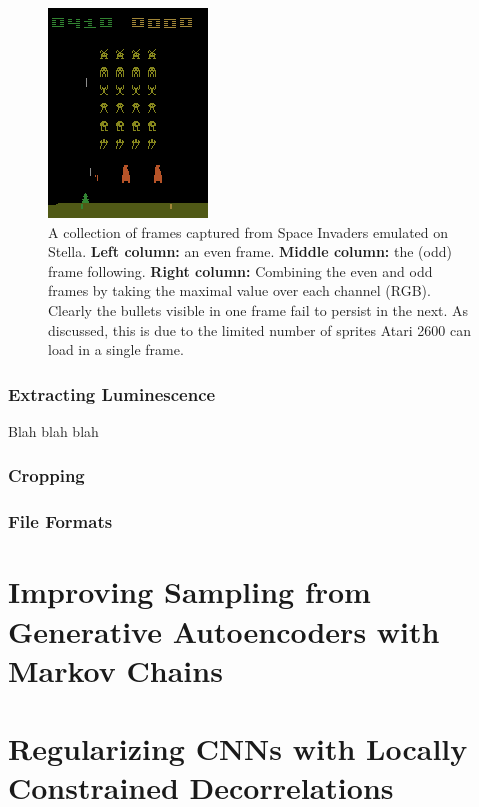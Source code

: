 \begin{figure}
\begin{multicols}{3}
    \includegraphics[scale=0.8]{figures/related_work/space_invaders_1044_rgb_maximum_of_even_odd.png}\par
\end{multicols}
\caption{A collection of frames captured from Space Invaders emulated on Stella. \textbf{Left column:} an even frame. \textbf{Middle column:} the (odd) frame following. \textbf{Right column:} Combining the even and odd frames by taking the maximal value over each channel (RGB). Clearly the bullets visible in one frame fail to persist in the next. As discussed, this is due to the limited number of sprites Atari 2600 can load in a single frame.}
\label{fig:even_and_odd_frames_space_invaders}
\end{figure}

\subsubsection{Extracting Luminescence}
Blah blah blah

\subsubsection{Cropping}

\subsubsection{File Formats}

%
%
%
%
%
\section{Improving Sampling from Generative Autoencoders with Markov Chains}
\cite{Creswell2016}

%
%
%
%
%
\section{Regularizing CNNs with Locally Constrained Decorrelations}
\cite{Rodriguez2016}